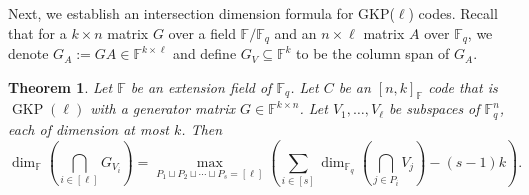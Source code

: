 \documentclass[11pt]{article}
\theoremstyle{plain}
\newtheorem{thm}{Theorem}[section]
\theoremstyle{definition}
\theoremstyle{remark}
\newcommand{\F}{\mathbb{F}}
\begin{document}
Next, we establish an intersection dimension formula for GKP($\ell$) codes.
Recall that for a $k\times n$ matrix $G$ over a field $\F/\F_q$ and an $n\times \ell$ matrix $A$ over $\F_q$, we denote $G_A:=GA\in \F^{k\times \ell}$ and define $G_V\subseteq \F^k$ to be the column span of $G_A$. 
 
\begin{thm}\label{interction_thm_G}
Let $\F$ be an extension field of $\F_q$. Let $C$ be an $[n, k]_{\F}$ code that is $\operatorname{GKP}(\ell)$ with a generator matrix $G\in\F^{k\times n}$. Let $V_1,\dots,V_\ell$ be subspaces of $\F_q^n$, each of dimension at most $k$. Then
\begin{equation}\label{intersec_fG}
\dim_{\F}\left(\bigcap_{i\in[\ell]}G_{V_i}\right)=\max_{P_1\sqcup P_2\sqcup \cdots\sqcup P_s=[\ell]}\left(\sum_{i\in[s]}\dim_{\F_q}\left(\bigcap_{j\in P_i}V_j\right)-(s-1)k\right).
\end{equation} 
\end{thm}
\end{document}
